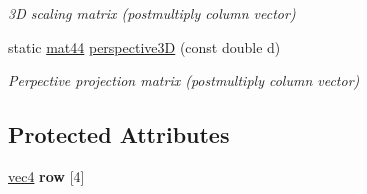 \begin{DoxyCompactItemize}
\begin{DoxyCompactList}\small\item\em 3\-D scaling matrix (postmultiply column vector) \end{DoxyCompactList}\item 
\hypertarget{classutil_1_1math_1_1mat44_a451ac9981c9d565e2f57504aca8ab0a2}{static \hyperlink{classutil_1_1math_1_1mat44}{mat44} \hyperlink{classutil_1_1math_1_1mat44_a451ac9981c9d565e2f57504aca8ab0a2}{perspective3\-D} (const double d)}\label{classutil_1_1math_1_1mat44_a451ac9981c9d565e2f57504aca8ab0a2}

\begin{DoxyCompactList}\small\item\em \-Perpective projection matrix (postmultiply column vector) \end{DoxyCompactList}\end{DoxyCompactItemize}
\subsection*{\-Protected \-Attributes}
\begin{DoxyCompactItemize}
\item 
\hypertarget{classutil_1_1math_1_1mat44_a416a1be35918398911cc74acd514154a}{\hyperlink{classutil_1_1math_1_1vec4}{vec4} {\bfseries row} \mbox{[}4\mbox{]}}\label{classutil_1_1math_1_1mat44_a416a1be35918398911cc74acd514154a}

\end{DoxyCompactItemize}
